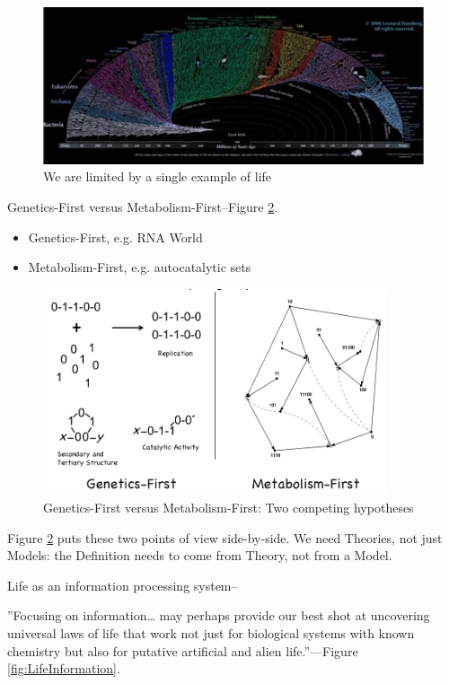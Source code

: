 \documentclass[]{article}
\begin{document}
\begin{figure}[H]
	\caption{We are limited by a single example of life}\label{fig:yatol}
	\includegraphics[width=\textwidth]{YATOL}
\end{figure}

Genetics-First versus Metabolism-First--Figure \ref{fig:GeneticsVsMetabolism}.

\begin{itemize}
	\item Genetics-First, e.g. RNA World
	\item Metabolism-First, e.g. autocatalytic sets
\end{itemize}

\begin{figure}[H]
	\caption{Genetics-First versus Metabolism-First: Two competing hypotheses}\label{fig:GeneticsVsMetabolism}
	\includegraphics[width=0.9\textwidth]{GeneticsVsMetabolism}
\end{figure}

Figure \ref{fig:GeneticsVsMetabolism} puts these two points of view side-by-side. We need Theories, not just Models: the Definition needs to come from Theory, not from a Model.

Life as an information processing system--\cite{nurse2008life}

''Focusing on information… may perhaps provide our best shot at uncovering universal laws of life that work not just for biological systems with known chemistry but also for putative artificial and alien life.''--\cite{cronin2016beyond}--Figure \ref{fig:LifeInformation}.
\end{document}
